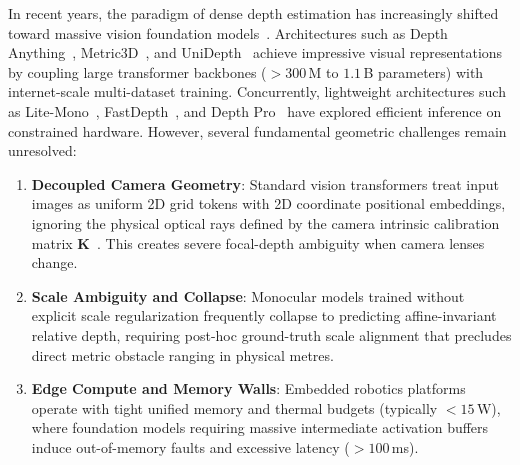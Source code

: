 In recent years, the paradigm of dense depth estimation has increasingly shifted toward massive vision foundation models~\cite{ranftl2021vision,yang2024depth,yang2024depth2,yin2023metric3d,piccinelli2025unidepth2}. Architectures such as Depth Anything~\cite{yang2024depth,yang2024depth2}, Metric3D~\cite{yin2023metric3d,yin2024metric3dv2}, and UniDepth~\cite{piccinelli2024unidepth,piccinelli2025unidepth2} achieve impressive visual representations by coupling large transformer backbones ($>300$\,M to $1.1$\,B parameters) with internet-scale multi-dataset training. Concurrently, lightweight architectures such as Lite-Mono~\cite{zhang2023litemono}, FastDepth~\cite{wofk2019fastdepth}, and Depth Pro~\cite{bochkovskiy2024depthpro} have explored efficient inference on constrained hardware. However, several fundamental geometric challenges remain unresolved:
\begin{enumerate}
    \item \textbf{Decoupled Camera Geometry}: Standard vision transformers treat input images as uniform 2D grid tokens with 2D coordinate positional embeddings, ignoring the physical optical rays defined by the camera intrinsic calibration matrix $\mathbf{K}$~\cite{piccinelli2024unidepth}. This creates severe focal-depth ambiguity when camera lenses change.
    \item \textbf{Scale Ambiguity and Collapse}: Monocular models trained without explicit scale regularization frequently collapse to predicting affine-invariant relative depth, requiring post-hoc ground-truth scale alignment that precludes direct metric obstacle ranging in physical metres.
    \item \textbf{Edge Compute and Memory Walls}: Embedded robotics platforms operate with tight unified memory and thermal budgets (typically $<15$\,W), where foundation models requiring massive intermediate activation buffers induce out-of-memory faults and excessive latency ($>100$\,ms).
\end{enumerate}

